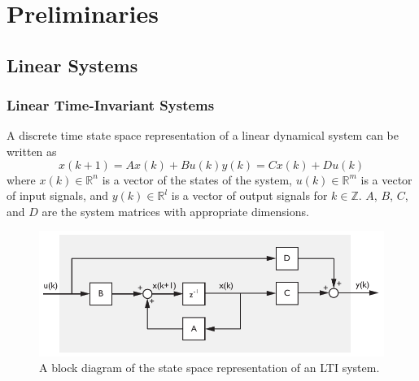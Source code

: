 \chapter{Preliminaries}

\section{Linear Systems}
\subsection{Linear Time-Invariant Systems}\label{sec:linear_time_invariant_systems}
A discrete time state space representation of a linear dynamical system can be written as
\begin{subequations}\label{eq:2_lti}
\begin{equation}x(k+1) = Ax(k) + Bu(k)\end{equation}
\begin{equation}y(k) = Cx(k) + Du(k)\end{equation}
\end{subequations}
where $x(k) \in \mathbb{R}^n$ is a vector of the states of the system, $u(k) \in \mathbb{R}^m$ is a vector of input signals, and $y(k) \in \mathbb{R}^l$ is a vector of output signals for $k \in \mathbb{Z}$. $A$, $B$, $C$, and $D$ are the system matrices with appropriate dimensions.
\begin{figure}[htb!]
	\centering
	\includegraphics{../fig/lti_block_diagram.pdf}
	\caption{A block diagram of the state space representation of an LTI system.}
\end{figure}

